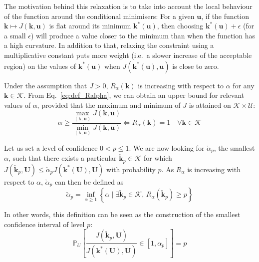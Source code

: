 \documentclass[npg, manuscript]{copernicus}
\newcommand{\Prob}{\mathbb{P}}
\newcommand{\checkap}{\check{\alpha}_p}
\newcommand{\checkkp}{\check{\mathbf{k}}_p}
\begin{document}
The motivation behind this relaxation is to take into account the local behaviour of the function around the conditional minimisers:
For a given $\mathbf{u}$, if the function $\mathbf{k} \mapsto J(\mathbf{k},\mathbf{u})$ is flat around its minimum $\mathbf{k}^*(\mathbf{u})$, then choosing  $\mathbf{k}^*(\mathbf{u}) + \epsilon$ (for a small $\epsilon$) will produce a value closer to the minimum than when the function has a high curvature.
In addition to that, relaxing the constraint using a multiplicative constant puts more weight (i.e.\ a slower increase of the acceptable region) on the values of $\mathbf{k}^*(\mathbf{u})$ when $J(\mathbf{k}^*(\mathbf{u}),\mathbf{u})$ is close to zero.

Under the assumption that $J>0$, $R_{\alpha}(\mathbf{k})$ is increasing with respect to $\alpha$ for any $\mathbf{k}\in\mathcal{K}$. 
From Eq.~\eqref{eq:def_Ralpha}, we can obtain an upper bound for relevant values of $\alpha$, provided that the maximum and minimum of $J$ is attained on $\mathcal{K}\times\mathcal{U}$:
\begin{equation}
  \label{eq:upper_bound_alpha}
  \alpha \geq \frac{\max_{(\mathbf{k},\mathbf{u})} J(\mathbf{k},\mathbf{u})}{\min_{(\mathbf{k},\mathbf{u})} J(\mathbf{k},\mathbf{u}) } \iff R_\alpha(\mathbf{k}) = 1 \quad \forall \mathbf{k}\in\mathcal{K}
\end{equation}





Let us set a level of confidence $0<p \leq 1$. We are now looking for $\check{\alpha}_p$, the smallest $\alpha$, such that there exists a particular $\checkkp \in \mathcal{K}$ for which $J(\check{\mathbf{k}}_p,\mathbf{U}) \leq \check{\alpha}_p J(\mathbf{k}^*(\mathbf{U}), \mathbf{U})$ with probability $p$. As $R_\alpha$ is increasing with respect to $\alpha$,  $\check{\alpha}_p$ can then be defined as
\begin{equation}
  \label{eq:def_alpha_check}
  \checkap = \inf_{\alpha\geq 1} \left\{ \alpha \mid \exists \checkkp \in \mathcal{K},\, R_{\alpha}(\checkkp) \geq p \right\}
\end{equation}

In other words, this definition can be seen as the construction of the smallest confidence interval of level $p$:
\begin{equation}
  \label{eq:def_CI}
  \Prob_U\left[ \frac{J(\checkkp,\mathbf{U})}{J(\mathbf{k}^*(\mathbf{U}),\mathbf{U})}\in [1, \alpha_p]\right] = p
\end{equation}
\end{document}
